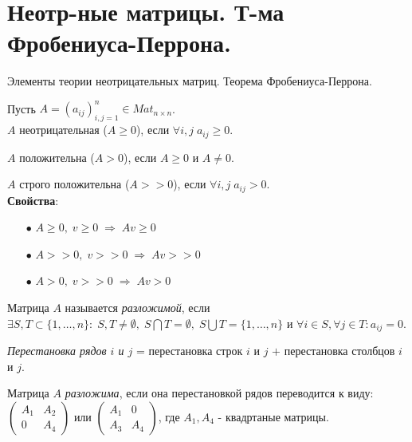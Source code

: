 \chapter{Неотр-ные матрицы. Т-ма Фробениуса-Перрона.}\label{cha:7}

Элементы теории неотрицательных матриц. Теорема Фробениуса-Перрона.

Пусть $A = (a_{ij})_{i, j = 1}^n \in Mat_{n \times n}$.\\

$A$ неотрицательная ($A \ge 0$), если $\forall i, j \; a_{ij} \ge 0$.

$A$ положительна ($A > 0$), если $A \ge 0$ и $A \not = 0$.

$A$ строго положительна ($A >> 0$), если $\forall i, j \; a_{ij} > 0$.\\

\textbf{Свойства}:
\begin{itemize}
	\item[$\bullet$]
		$A \ge 0, \; v \ge 0 \; \Rightarrow \; A v \ge 0$
	\item[$\bullet$]
		$A >> 0, \; v >> 0 \; \Rightarrow \; A v >> 0$
	\item[$\bullet$]
		$A > 0, \; v >> 0 \; \Rightarrow \; A v > 0$
\end{itemize}

\begin{definition}\label{cha:7/def:1}
	Матрица $A$ называется \textit{разложимой}, если $\exists S, T \subset \{1, \dots, n\}: \; S, T \not = \emptyset, \; S \bigcap T = \emptyset, \; S \bigcup T = \{1, \dots, n\}$ и $\forall i \in S, \forall j \in T: a_{ij} = 0$.
\end{definition}

\begin{definition}\label{cha:7/def:2}
	\textit{Перестановка рядов $i$ и $j$} = перестановка строк $i$ и $j$ $+$ перестановка столбцов $i$ и $j$.
\end{definition}

\begin{definition}\label{cha:7/def:3}
	Матрица $A$ \textit{разложима}, если она перестановкой рядов переводится к виду: $\begin{pmatrix}
		A_1 & A_2 \\
		0 & A_4
	\end{pmatrix}$ или $\begin{pmatrix}
		A_1 & 0 \\
		A_3 & A_4
	\end{pmatrix}$, где $A_1, A_4$ - квадртаные матрицы.
\end{definition}

